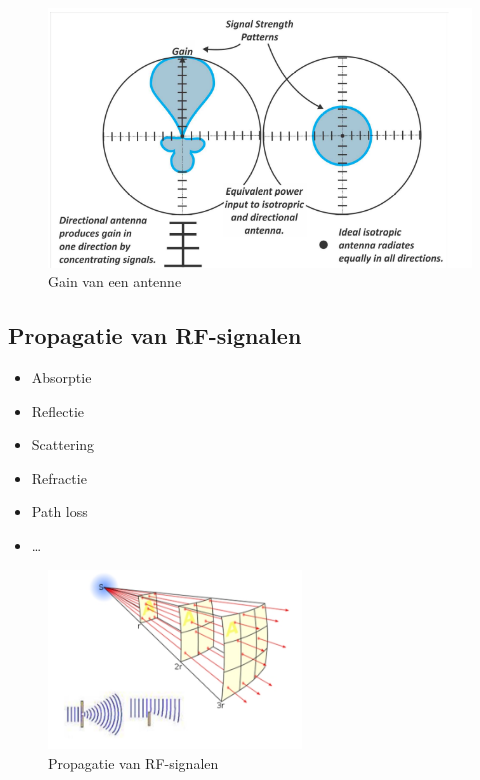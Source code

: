 \documentclass{article}
\begin{document}
\begin{figure}[H]
    \centering
    \includegraphics[width=\textwidth]{Screenshot_20200309_122914.png}
    \caption{Gain van een antenne}
\end{figure}

\subsection{Propagatie van RF-signalen}
\begin{itemize}
    \item Absorptie
    \item Reflectie
    \item Scattering
    \item Refractie
    \item Path loss
    \item \dots
\end{itemize}

\begin{figure}[H]
    \centering
    \includegraphics[width=0.6\textwidth]{Screenshot_20200309_123000.png}
    \caption{Propagatie van RF-signalen}
\end{figure}
\end{document}
